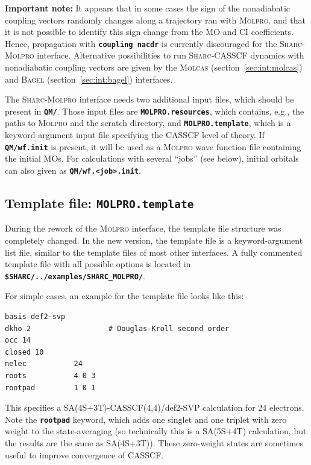 \documentclass[a4paper,10pt,DIV=15,openany]{scrbook}
\newcommand{\sharc}{\textsc{Sharc}}
\newcommand{\ttt}[1]{\textbf{\texttt{#1}}}
\newenvironment{example}{
  \setlength{\OuterFrameSep}{3pt}
  \vspace{0mm}
  \definecolor{shadecolor}{HTML}{E4F4FF}
  \begin{shaded}
}{
  \end{shaded}
}
\begin{document}
\textbf{Important note:} It appears that in some cases the sign of the nonadiabatic coupling vectors randomly changes along a trajectory ran with \textsc{Molpro}, and that it is not possible to identify this sign change from the MO and CI coefficients.
Hence, propagation with \ttt{coupling nacdr} is currently discouraged for the \sharc-\textsc{Molpro} interface.
Alternative possibilities to run \sharc-CASSCF dynamics with nonadiabatic coupling vectors are given by the \textsc{Molcas} (section~\ref{sec:int:molcas}) and \textsc{Bagel} (section~\ref{sec:int:bagel}) interfaces.

The \sharc-\textsc{Molpro} interface needs two additional input files, which should be present in \ttt{QM/}. Those input files are \ttt{MOLPRO.resources}, which contains, e.g., the paths to \textsc{Molpro} and the scratch directory, and \ttt{MOLPRO.template}, which is a keyword-argument input file specifying the CASSCF level of theory. 
If \ttt{QM/wf.init} is present, it will be used as a \textsc{Molpro} wave function file containing the initial MOs.
For calculations with several ``jobs'' (see below), initial orbitals can also given as \ttt{QM/wf.<job>.init}.

\subsection{Template file: \ttt{MOLPRO.template}}

During the rework of the \textsc{Molpro} interface, the template file structure was completely changed.
In the new version, the template file is a keyword-argument list file, similar to the template files of most other interfaces.
A fully commented template file with all possible options is located in \ttt{\$SHARC/../examples/SHARC\_MOLPRO/}.

For simple cases, an example for the template file looks like this:
\begin{example}
  \begin{verbatim}
basis def2-svp
dkho 2                  # Douglas-Kroll second order
occ 14
closed 10
nelec           24
roots           4 0 3
rootpad         1 0 1
\end{verbatim}
\end{example}
This specifies a SA(4S+3T)-CASSCF(4,4)/def2-SVP calculation for 24 electrons.
Note the \ttt{rootpad} keyword, which adds one singlet and one triplet with zero weight to the state-averaging (so technically this is a SA(5S+4T) calculation, but the results are the same as SA(4S+3T)).
These zero-weight states are sometimes useful to improve convergence of CASSCF.
\end{document}
